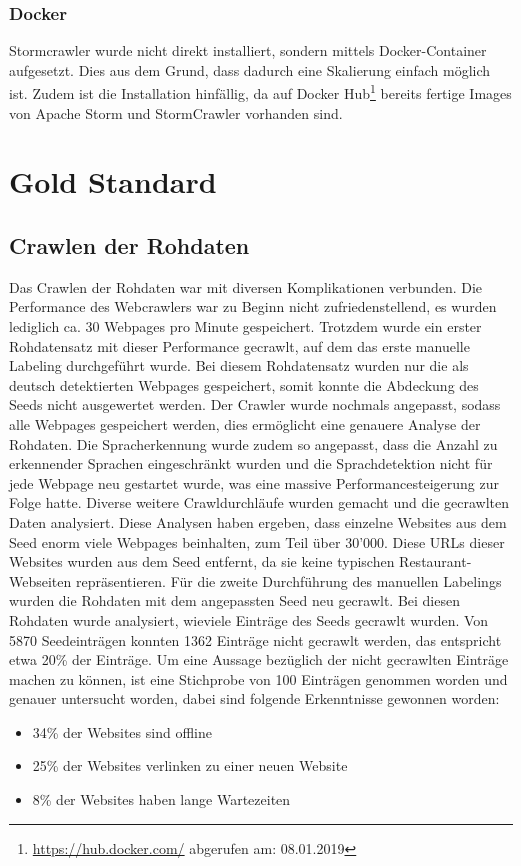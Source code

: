 \subsubsection{Docker}
Stormcrawler wurde nicht direkt installiert, sondern mittels Docker-Container aufgesetzt.
Dies aus dem Grund, dass dadurch eine Skalierung einfach möglich ist.
Zudem ist die Installation hinfällig, da auf Docker Hub\footnote{\url{https://hub.docker.com/} abgerufen am: 08.01.2019} bereits fertige Images von Apache Storm und StormCrawler vorhanden sind.
\section{Gold Standard}
\subsection{Crawlen der Rohdaten}
Das Crawlen der Rohdaten war mit diversen Komplikationen verbunden.
Die Performance des Webcrawlers war zu Beginn nicht zufriedenstellend, es wurden lediglich ca. 30 Webpages pro Minute gespeichert.
Trotzdem wurde ein erster Rohdatensatz mit dieser Performance gecrawlt, auf dem das erste manuelle Labeling durchgeführt wurde.
Bei diesem Rohdatensatz wurden nur die als deutsch detektierten Webpages gespeichert, somit konnte die Abdeckung des Seeds nicht ausgewertet werden.
Der Crawler wurde nochmals angepasst, sodass alle Webpages gespeichert werden, dies ermöglicht eine genauere Analyse der Rohdaten.
Die Spracherkennung wurde zudem so angepasst, dass die Anzahl zu erkennender Sprachen eingeschränkt wurden und die Sprachdetektion nicht für jede Webpage neu gestartet wurde, was eine massive Performancesteigerung zur Folge hatte.
Diverse weitere Crawldurchläufe wurden gemacht und die gecrawlten Daten analysiert.
Diese Analysen haben ergeben, dass einzelne Websites aus dem Seed enorm viele Webpages beinhalten, zum Teil über 30'000.
Diese URLs dieser Websites wurden aus dem Seed entfernt, da sie keine typischen Restaurant-Webseiten repräsentieren.
Für die zweite Durchführung des manuellen Labelings wurden die Rohdaten mit dem angepassten Seed neu gecrawlt.
Bei diesen Rohdaten wurde analysiert, wieviele Einträge des Seeds gecrawlt wurden.
Von 5870 Seedeinträgen konnten 1362 Einträge nicht gecrawlt werden, das entspricht etwa 20\% der Einträge.
Um eine Aussage bezüglich der nicht gecrawlten Einträge machen zu können, ist eine Stichprobe von 100 Einträgen genommen worden und genauer untersucht worden, dabei sind folgende Erkenntnisse gewonnen worden:
\begin{itemize}
	\item 34\% der Websites sind offline
	\item 25\% der Websites verlinken zu einer neuen Website
	\item 8\% der Websites haben lange Wartezeiten
\end{itemize}
